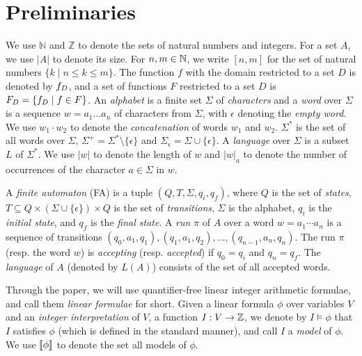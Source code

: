 \documentclass[sigplan,screen]{acmart}
\begin{document}
\section{Preliminaries} \label{section:preliminary}

We use $\mathbb{N}$ and $\mathbb{Z}$ to denote the sets of natural numbers and 
integers. For a set $A$, we use $|A|$ to denote its size. 
For $n,m\in\mathbb{N}$, we write $[n,m]$ for the set of natural numbers 
$\{k\mid n\leq k \leq m\}$. 
The function $f$ with the domain restricted to a set $D$ is denoted by $f_{D}$,
and a set of functions $F$ restricted to a set $D$ is $F_{D} = \{f_{D} \mid f \in F\}$.
An \emph{alphabet} is a finite set $\Sigma$ of \emph{characters} and a \emph{word} over $\Sigma$ is a sequence $w = a_1\ldots a_n$ of characters from $\Sigma$, with $\epsilon$ denoting the \emph{empty word}. 
We use $w_1\cdot w_2$ to denote the \emph{concatenation} of words $w_1$ and $w_2$.
$\Sigma^*$ is the set of all words over $\Sigma$, $\Sigma^+ = \Sigma^*\setminus \{\epsilon\}$ and $\Sigma_\epsilon = \Sigma\cup\{\epsilon\}$.
A \emph{language} over $\Sigma$ is a subset $L$ of $\Sigma^*$. 
%
We use $|w|$ to denote the length of $w$ and $|w|_a$ to denote the number of occurrences of the character $a\in \Sigma$ in $w$. 

A \emph{finite automaton} (FA) is a tuple $(Q,T,\Sigma,q_i,q_f)$, where $Q$ is the set of \emph{states}, $T\subseteq Q\times (\Sigma \cup \{\epsilon\}) \times Q $ is the set of \emph{transitions}, $\Sigma$ is the alphabet, $q_i$ is the \emph{initial state}, and $q_f$ is the \emph{final state}. 
A \emph{run} $\pi$ of $A$ over a word $w = a_1\cdots a_n$ is a sequence of transitions $(q_0,a_1,q_1),(q_1,a_1,q_2),\ldots,(q_{n-1},a_n,q_n)$.
 The run $\pi$ (resp. the word $w$) is \emph{accepting} (resp. \emph{accepted}) if $q_0 = q_i$ and $q_n = q_f$.
The \emph{language} of $A$ (denoted by $L(A)$) consists of  the set  of all accepted words.


Through the paper, we will use quantifier-free linear integer arithmetic formulae, and call them \emph{linear formulae} for short.  
Given a linear formula $\phi$ over variables $V$ and an \emph{integer interpretation} of $V$, a function $I:V\rightarrow \mathbb{Z}$, 
we denote by $I\models \phi$ that $I$ satisfies $\phi$ (which is defined in the standard manner), and call $I$ a \emph{model} of $\phi$. 
We use $[\![\phi]\!]$ to denote the set all models of $\phi$.%
\end{document}
